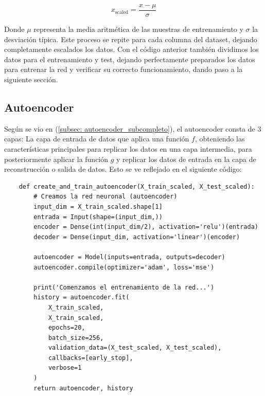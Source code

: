 \documentclass[12pt]{article}
\numberwithin{equation}{section} %
\begin{document}
    \vspace{2.5mm}

    \begin{equation}
        x_{\text{scaled}} = \frac{x - \mu}{\sigma}
    \end{equation}

    \vspace{2.5mm}

    Donde $\mu$ representa la media aritmética de las muestras de entrenamiento y $\sigma$ la desviación típica. Este proceso se repite para cada columna del dataset, dejando completamente escalados los datos. Con el código anterior también dividimos los datos para el entrenamiento y test, dejando perfectamente preparados los datos para entrenar la red y verificar su correcto funcionamiento, dando paso a la siguiente sección.

    \vspace{10mm}





    \subsection{Autoencoder}\label{subsec: autoencoder_impl}

    \vspace{5mm}

    Según se vio en (\ref{subsec: autoencoder_subcompleto}), el autoencoder consta de 3 capas: La capa de entrada de datos que aplica una función $f$, obteniendo las características principales para replicar los datos en una capa intermedia, para posteriormente aplicar la función $g$ y replicar los datos de entrada en la capa de reconstrucción o salida de datos. Esto se ve reflejado en el siguiente código:

    \begin{verbatim}
    def create_and_train_autoencoder(X_train_scaled, X_test_scaled):
        # Creamos la red neuronal (autoencoder)
        input_dim = X_train_scaled.shape[1]
        entrada = Input(shape=(input_dim,))
        encoder = Dense(int(input_dim/2), activation='relu')(entrada)
        decoder = Dense(input_dim, activation='linear')(encoder)

        autoencoder = Model(inputs=entrada, outputs=decoder)
        autoencoder.compile(optimizer='adam', loss='mse')

        print('Comenzamos el entrenamiento de la red...')
        history = autoencoder.fit(
            X_train_scaled,
            X_train_scaled,
            epochs=20,
            batch_size=256,
            validation_data=(X_test_scaled, X_test_scaled),
            callbacks=[early_stop],
            verbose=1
        )
        return autoencoder, history
    \end{verbatim}   
    
\end{document}
